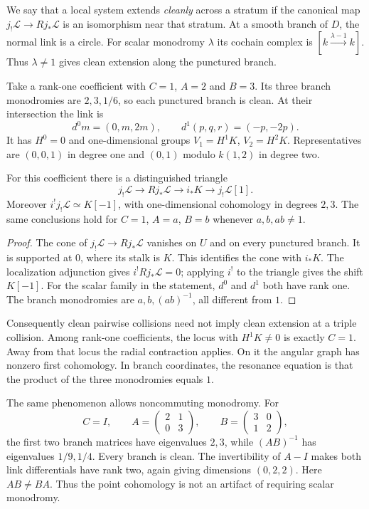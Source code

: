 We say that a local system extends \emph{cleanly} across a
stratum if the canonical map $j_!\mathcal L\to Rj_*\mathcal L$
is an isomorphism near that stratum. At a smooth branch of $D$,
the normal link is a circle. For scalar monodromy $\lambda$
its cochain complex is $[k\xrightarrow{\lambda-1}k]$.
Thus $\lambda\ne1$ gives clean extension along the punctured
branch.

Take a rank-one coefficient with $C=1$, $A=2$ and $B=3$.
Its three branch monodromies are $2,3,1/6$, so each punctured
branch is clean. At their intersection the link is
\[
 d^0m=(0,m,2m),\qquad d^1(p,q,r)=(-p,-2p).
\]
It has $H^0=0$ and one-dimensional groups
$V_1=H^1K$, $V_2=H^2K$. Representatives are $(0,0,1)$
in degree one and $(0,1)$ modulo $k(1,2)$ in degree two.

\begin{proposition}\label{cycoll:prop:clean-defect}
For this coefficient there is a distinguished triangle
\begin{equation}\label{cycoll:eq:clean-triangle}
 j_!\mathcal L\longrightarrow Rj_*\mathcal L
       \longrightarrow i_*K\longrightarrow j_!\mathcal L[1].
\end{equation}
Moreover $i^!j_!\mathcal L\simeq K[-1]$, with
one-dimensional cohomology in degrees $2,3$. The same conclusions
hold for $C=1$, $A=a$, $B=b$ whenever $a,b,ab\ne1$.
\end{proposition}
\begin{proof}
The cone of $j_!\mathcal L\to Rj_*\mathcal L$ vanishes on
$U$ and on every punctured branch. It is supported at $0$,
where its stalk is $K$. This identifies the cone with $i_*K$.
The localization adjunction gives $i^!Rj_*\mathcal L=0$;
applying $i^!$ to the triangle gives the shift $K[-1]$.
For the scalar family in the statement, $d^0$ and $d^1$ both
have rank one. The branch monodromies are $a,b,(ab)^{-1}$,
all different from $1$.
\end{proof}

Consequently clean pairwise collisions need not imply clean
extension at a triple collision. Among rank-one coefficients,
the locus with $H^1K\ne0$ is exactly $C=1$. Away from that
locus the radial contraction applies. On it the angular
graph has nonzero first cohomology. In branch coordinates,
the resonance equation is that the product of the three
monodromies equals $1$.

The same phenomenon allows noncommuting monodromy. For
\begin{equation}\label{cycoll:eq:clean-matrices}
 C=I,\qquad
 A=\begin{pmatrix}2&1\\0&3\end{pmatrix},\qquad
 B=\begin{pmatrix}3&0\\1&2\end{pmatrix},
\end{equation}
the first two branch matrices have eigenvalues $2,3$, while
$(AB)^{-1}$ has eigenvalues $1/9,1/4$. Every branch is clean.
The invertibility of $A-I$ makes both link differentials
have rank two, again giving dimensions $(0,2,2)$.
Here $AB\ne BA$. Thus the point cohomology is not an artifact
of requiring scalar monodromy.

